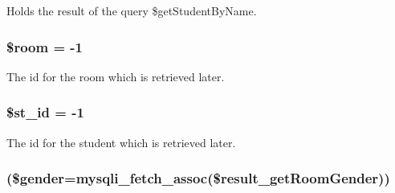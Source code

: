 \-Holds the result of the query \$get\-Student\-By\-Name. \hypertarget{getRoomByName_8php_ab285a2e759ea45a70f8ff40a63d2fe89}{
\subsubsection[{\$room}]{\setlength{\rightskip}{0pt plus 5cm}\$room = -\/1}}\label{getRoomByName_8php_ab285a2e759ea45a70f8ff40a63d2fe89}
\-The id for the room which is retrieved later. \hypertarget{getRoomByName_8php_ab68b86e23fd74e101c03130a49b24f66}{
\subsubsection[{\$st\-\_\-id}]{\setlength{\rightskip}{0pt plus 5cm}\$st\-\_\-id = -\/1}}\label{getRoomByName_8php_ab68b86e23fd74e101c03130a49b24f66}
\-The id for the student which is retrieved later. \hypertarget{getRoomByName_8php_a47624afeb833a11e7095ab00ea7bd2ea}{
\subsubsection[{while}]{(\$gender=mysqli\-\_\-fetch\-\_\-assoc(\$result\-\_\-get\-Room\-Gender))}}\label{getRoomByName_8php_a47624afeb833a11e7095ab00ea7bd2ea}
